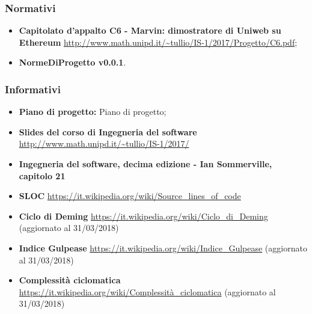 \subsubsection{Normativi}
\begin{itemize}
	\item
	\textbf{Capitolato d’appalto C6 - Marvin: dimostratore di Uniweb su Ethereum}
	\url{http://www.math.unipd.it/~tullio/IS-1/2017/Progetto/C6.pdf};
	\item
	\textbf{NormeDiProgetto v0.0.1}. 
	
	
\end{itemize}
\subsubsection{Informativi}
\begin{itemize}
	\item
	\textbf{Piano di progetto:} Piano di progetto;
	\item 
	\textbf{Slides del corso di Ingegneria del software} 
	\url{http://www.math.unipd.it/~tullio/IS-1/2017/}
	\item 
	\textbf{Ingegneria del software, decima edizione - Ian Sommerville, capitolo 21} 
	\item
	\textbf{SLOC}
	\url{https://it.wikipedia.org/wiki/Source_lines_of_code}
	\item
	\textbf{Ciclo di Deming}
	\url{https://it.wikipedia.org/wiki/Ciclo_di_Deming} (aggiornato al 31/03/2018)
	\item
	\textbf{Indice Gulpease}
	\url{https://it.wikipedia.org/wiki/Indice_Gulpease} (aggiornato al 31/03/2018)
	\item
	\textbf{Complessità ciclomatica}
	\url{https://it.wikipedia.org/wiki/Complessità_ciclomatica} (aggiornato al 31/03/2018)
	
\end{itemize}
